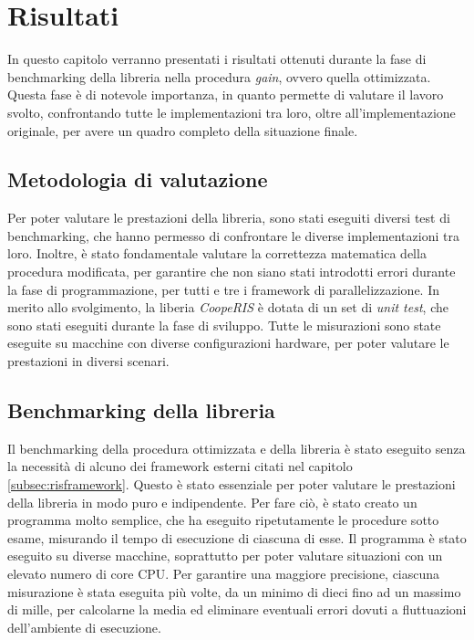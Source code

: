 \chapter{Risultati}
\label{ch:risultati}

In questo capitolo verranno presentati i risultati ottenuti durante la fase di
benchmarking della libreria nella procedura \textit{gain}, ovvero quella
ottimizzata. Questa fase è di notevole importanza, in quanto permette di
valutare il lavoro svolto, confrontando tutte le implementazioni tra loro, oltre
all'implementazione originale, per avere un quadro completo della situazione finale.

\section{Metodologia di valutazione}
\label{sec:bencharmking}

Per poter valutare le prestazioni della libreria, sono stati eseguiti diversi test di benchmarking,
che hanno permesso di confrontare le diverse implementazioni tra loro. Inoltre,
è stato fondamentale valutare la correttezza matematica della procedura
modificata, per garantire che non siano stati introdotti errori durante la fase di
programmazione, per tutti e tre i framework di parallelizzazione. In merito allo
svolgimento, la liberia \textit{CoopeRIS} è dotata di un set di \textit{unit
test}, che sono stati eseguiti durante la fase di sviluppo. Tutte le misurazioni
sono state eseguite su macchine con diverse configurazioni hardware, per poter
valutare le prestazioni in diversi scenari.

\section{Benchmarking della libreria}
\label{sec:benchmarking}

Il benchmarking della procedura ottimizzata e della libreria è stato eseguito
senza la necessità di alcuno dei framework esterni citati nel capitolo
\ref{subsec:risframework}. Questo è stato essenziale per poter valutare le prestazioni
della libreria in modo puro e indipendente. Per fare ciò, è stato creato un programma
molto semplice, che ha eseguito ripetutamente le procedure sotto esame, misurando
il tempo di esecuzione di ciascuna di esse. Il programma è stato eseguito su
diverse macchine, soprattutto per
poter valutare situazioni con un elevato numero di core CPU. Per garantire una maggiore
precisione, ciascuna misurazione è stata eseguita più volte, da un minimo di dieci
fino ad un massimo di mille, per calcolarne la media ed eliminare eventuali
errori dovuti a fluttuazioni dell'ambiente di esecuzione.


